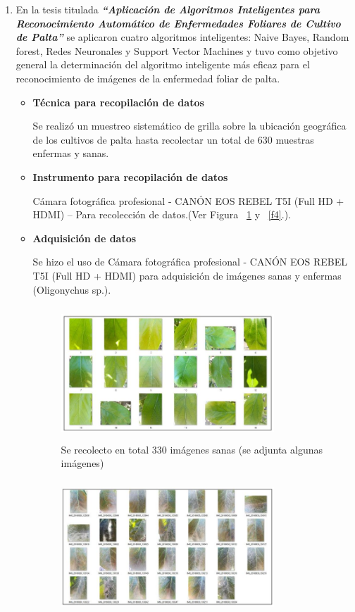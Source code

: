 \documentclass[10pt,journal]{IEEEtran}
\begin{document}
\begin{enumerate}
\item En la tesis titulada \textit{\textbf{“Aplicación de Algoritmos Inteligentes para Reconocimiento Automático de Enfermedades Foliares de Cultivo de Palta”}} \citep{castro} se aplicaron cuatro algoritmos inteligentes: Naive Bayes, Random forest, Redes Neuronales y Support Vector Machines y tuvo como objetivo general la determinación del algoritmo inteligente más eficaz para el reconocimiento de imágenes de la enfermedad foliar de palta.
\begin{itemize}
    \item {\textbf{Técnica para recopilación de datos}}\par
    Se realizó un muestreo sistemático de grilla sobre la ubicación geográfica de los cultivos de palta hasta recolectar un total de 630 muestras enfermas y sanas.
    \item {\textbf{Instrumento para recopilación de datos}}\par
    Cámara fotográfica profesional - CANÓN EOS REBEL T5I (Full HD + HDMI) – Para recolección de datos.(Ver Figura ~\ref{f3} y ~\ref{f4}.).
    \item {\textbf{Adquisición de datos}}\par
    Se hizo el uso de Cámara fotográfica profesional - CANÓN EOS REBEL T5I (Full HD + HDMI) para adquisición de imágenes sanas y enfermas (Oligonychus sp.).
    \begin{figure}[H]
        \begin{center}
            \includegraphics[width=8cm, height=5cm]{figuras/3.JPG}
            \caption{Se recolecto en total 330 imágenes sanas (se adjunta algunas imágenes)}
            \label{f3} 
            \end{center}
    \end{figure}
        \begin{figure}[H]
        \begin{center}
            \includegraphics[width=8cm, height=5cm]{figuras/4.JPG}

\end{center}
\end{figure}
\end{itemize}
\end{enumerate}
\end{document}

